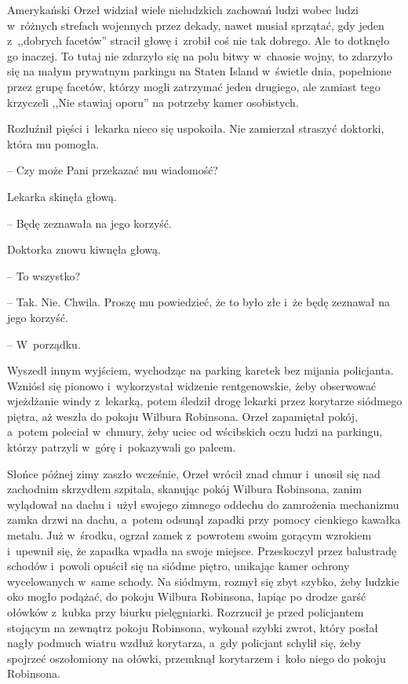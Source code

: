 \documentclass[oneside,polish,11pt,sfheadings]{mwbk}
\begin{document}
Amerykański Orzeł widział wiele nieludzkich zachowań ludzi wobec ludzi w~różnych strefach wojennych przez dekady, nawet musiał sprzątać, gdy
jeden z~,,dobrych facetów'' stracił głowę i~zrobił coś nie tak dobrego.
Ale to dotknęło go inaczej. To tutaj nie zdarzyło się na polu bitwy w~chaosie wojny, to zdarzyło się na małym prywatnym parkingu na Staten
Island w~świetle dnia, popełnione przez grupę facetów, którzy mogli
zatrzymać jeden drugiego, ale zamiast tego krzyczeli ,,Nie stawiaj
oporu'' na potrzeby kamer osobistych.

Rozluźnił pięści i~lekarka nieco się uspokoiła. Nie zamierzał straszyć
doktorki, która mu pomogła.

-- Czy może Pani przekazać mu wiadomość?

Lekarka skinęła głową.

-- Będę zeznawała na jego korzyść.

Doktorka znowu kiwnęła głową. 

-- To wszystko?

-- Tak. Nie. Chwila. Proszę mu powiedzieć, że to było złe i~że będę
zeznawał na jego korzyść.

-- W~porządku.

Wyszedł innym wyjściem, wychodząc na parking karetek bez mijania
policjanta. Wzniósł się pionowo i~wykorzystał widzenie rentgenowskie,
żeby obserwować wjeżdżanie windy z~lekarką, potem śledził drogę lekarki
przez korytarze siódmego piętra, aż weszła do pokoju Wilbura Robinsona.
Orzeł zapamiętał pokój, a~potem poleciał w~chmury, żeby uciec od
wścibskich oczu ludzi na parkingu, którzy patrzyli w~górę i~pokazywali
go palcem.

Słońce późnej zimy zaszło wcześnie, Orzeł wrócił znad chmur i~unosił się
nad zachodnim skrzydłem szpitala, skanując pokój Wilbura Robinsona,
zanim wylądował na dachu i~użył swojego zimnego oddechu do zamrożenia
mechanizmu zamka drzwi na dachu, a~potem odsunął zapadki przy pomocy
cienkiego kawałka metalu. Już w~środku, ogrzał zamek z~powrotem swoim
gorącym wzrokiem i~upewnił się, że zapadka wpadła na swoje miejsce.
Przeskoczył przez balustradę schodów i~powoli opuścił się na siódme
piętro, unikając kamer ochrony wycelowanych w~same schody. Na siódmym,
rozmył się zbyt szybko, żeby ludzkie oko mogło podążać, do pokoju
Wilbura Robinsona, łapiąc po drodze garść ołówków z~kubka przy biurku
pielęgniarki. Rozrzucił je przed policjantem stojącym na zewnątrz pokoju
Robinsona, wykonał szybki zwrot, który posłał nagły podmuch wiatru
wzdłuż korytarza, a~gdy policjant schylił się, żeby spojrzeć oszołomiony
na ołówki, przemknął korytarzem i~koło niego do pokoju Robinsona.
\end{document}
